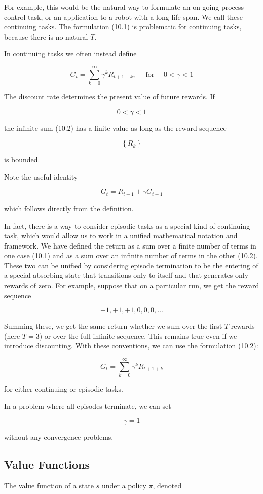 \documentclass[11pt]{article}
\theoremstyle{plain} %
\theoremstyle{remark}
\begin{document}
For example, this would be the natural way to formulate an on-going
process-control task, or an application to a robot with a long life span. We call these continuing tasks. The formulation (10.1) is problematic for continuing tasks, because
there is no natural $T$.

In continuing tasks we often instead define

$$
  G_{t}=\sum_{k=0}^{\infty} \gamma^{k} R_{t+1+k}, \quad \text { for } \quad 0<\gamma<1
$$

The discount rate determines the present value of future rewards. If

$$
  0<\gamma<1
$$

the infinite sum (10.2) has a finite value as long as the reward sequence

$$
  \left\{R_{k}\right\}
$$

is bounded.

Note the useful identity

$$
  G_{t}=R_{t+1}+\gamma G_{t+1}
$$

which follows directly from the definition.

In fact, there is a way to consider episodic tasks as a special kind of
continuing task, which would allow us to work in a unified mathematical
notation and framework. We have defined the return as a sum over a finite number of terms in one
case (10.1) and as a sum over an infinite number of terms in the other (10.2). These two can be unified by considering episode termination to be the
entering of a special absorbing state that transitions only to itself and that
generates only rewards of zero. For example, suppose that on a particular run, we get the reward
sequence

$$
  +1,+1,+1,0,0,0, \ldots
$$

Summing these, we get the same return whether we sum over the first $T$
rewards (here $T=3$) or over the full infinite sequence. This remains true even if we introduce discounting. With these conventions, we can use the formulation (10.2):

$$
  G_{t}=\sum_{k=0}^{\infty} \gamma^{k} R_{t+1+k}
$$

for either continuing or episodic tasks.

In a problem where all episodes terminate, we can set

$$
  \gamma=1
$$

without any convergence problems.

\subsection{Value Functions}
The value function of a state $s$ under a policy $\pi$, denoted
\end{document}
